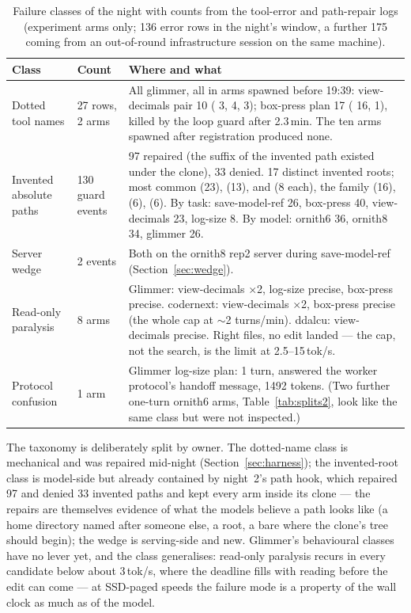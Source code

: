 \begin{table}[htbp]
\centering
\small
\caption{Failure classes of the night with counts from the tool-error and path-repair logs (experiment arms
only; 136 error rows in the night's window, a further 175 coming from an out-of-round infrastructure session on
the same machine).}\label{tab:taxonomy}
\begin{tabular}{P{3.6cm}P{2.4cm}P{7.4cm}}
\toprule
Class & Count & Where and what \\
\midrule
Dotted tool names & 27 rows, 2 arms & All glimmer, all in arms spawned before 19:39: view-decimals pair 10 ( 3,  4,  3); box-press plan 17 ( 16,  1), killed by the loop guard after 2.3\,min. The ten arms spawned after registration produced none. \\
Invented absolute paths & 130 guard events & 97 repaired (the suffix of the invented path existed under the clone), 33 denied. 17 distinct invented roots; most common  (23),  (13),  and  (8 each), the  family (16),  (6),  (6). By task: save-model-ref 26, box-press 40, view-decimals 23, log-size 8. By model: ornith6 36, ornith8 34, glimmer 26. \\
Server wedge & 2 events & Both on the ornith8 rep2 server during save-model-ref (Section~\ref{sec:wedge}). \\
Read-only paralysis & 8 arms & Glimmer: view-decimals $\times$2, log-size precise, box-press precise. codernext: view-decimals $\times$2, box-press precise (the whole cap at ${\sim}$2 turns/min). ddalcu: view-decimals precise. Right files, no edit landed --- the cap, not the search, is the limit at 2.5--15\,tok/s. \\
Protocol confusion & 1 arm & Glimmer log-size plan: 1 turn, answered the worker protocol's handoff message, 1492 tokens. (Two further one-turn ornith6 arms, Table~\ref{tab:splits2}, look like the same class but were not inspected.) \\
\bottomrule
\end{tabular}
\end{table}

The taxonomy is deliberately split by owner. The dotted-name class is mechanical and was repaired mid-night
(Section~\ref{sec:harness}); the invented-root class is model-side but already contained by night~2's path hook,
which repaired 97 and denied 33 invented paths and kept every arm inside its clone --- the repairs are themselves
evidence of what the models believe a path looks like (a home directory named after someone else, a
 root, a bare  where the clone's tree should begin); the wedge is serving-side and
new. Glimmer's behavioural classes have no lever yet, and the class generalises: read-only paralysis recurs in
every candidate below about 3\,tok/s, where the deadline fills with reading before the edit can come --- at
SSD-paged speeds the failure mode is a property of the wall clock as much as of the model.

